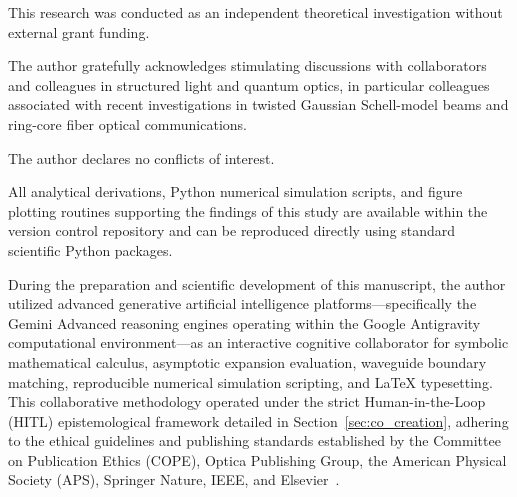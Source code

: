 \documentclass{optica-article}
\begin{document}
\begin{backmatter}
This research was conducted as an independent theoretical investigation without external grant funding.

The author gratefully acknowledges stimulating discussions with collaborators and colleagues in structured light and quantum optics, in particular colleagues associated with recent investigations in twisted Gaussian Schell-model beams and ring-core fiber optical communications.

The author declares no conflicts of interest.

All analytical derivations, Python numerical simulation scripts, and figure plotting routines supporting the findings of this study are available within the version control repository and can be reproduced directly using standard scientific Python packages.

During the preparation and scientific development of this manuscript, the author utilized advanced generative artificial intelligence platforms---specifically the Gemini Advanced reasoning engines operating within the Google Antigravity computational environment---as an interactive cognitive collaborator for symbolic mathematical calculus, asymptotic expansion evaluation, waveguide boundary matching, reproducible numerical simulation scripting, and LaTeX typesetting. This collaborative methodology operated under the strict Human-in-the-Loop (HITL) epistemological framework detailed in Section~\ref{sec:co_creation}, adhering to the ethical guidelines and publishing standards established by the Committee on Publication Ethics (COPE), Optica Publishing Group, the American Physical Society (APS), Springer Nature, IEEE, and Elsevier~\cite{Jauhiainen2026,Haber2025,OToole2024,VillaescusaNavarro2026,Chandra2026TheoPhysEval,Kacena2024}.


\end{backmatter}
\end{document}
